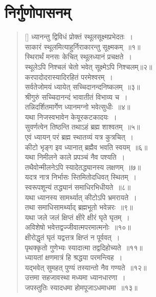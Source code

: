 \documentclass[twoside,12pt,notitlepage]{book}
\begin{document}
\section{निर्गुणोपासनम्}
\begin{verse}[\versewidth]
ध्यानन्तु द्विविधं प्रोक्तं स्थूलसूक्ष्मप्रभेदतः~।\\[-6pt]
साकारं स्थूलमित्याहुर्निराकारन्तु सूक्ष्मकम्~॥१॥\\
स्थिरार्थं मनसः केचित् स्थूलध्यानं प्रचक्षते~।\\[-6pt]
स्थूलेऽपि निश्चलं चेतो भवेत् सूक्ष्मेऽपि निश्चलम्॥२॥\\
करपादोदरास्यादिरहितं परमेश्वरम्~।\\[-6pt]
\clearpage
सर्वतेजोमयं ध्यायेत् सच्चिदानन्दनिष्कलम्~॥३॥\\
श्रीगुरुं सच्चिदानन्दं भावातीतं विभाव्य च~।\\[-6pt]
तन्निदर्शितमार्गेण ध्यानमग्नो भवेत्सुधीः~॥४॥\\
यथा निजस्वभावेन केयूरकटकादयः~।\\[-6pt]
सुवर्णत्वेन तिष्ठन्ति तथाऽहं ब्रह्म शाश्वतम्~॥५॥\\
एवं ध्यायन् परं ब्रह्म स्थातव्यं यत्र कुत्रचित्~।\\[-6pt]
कीटो भृङ्ग इव ध्यानात् ब्रह्मैव भवति स्वयम्~॥६॥\\
यथा निमीलने काले प्रपञ्चं नैव पश्यति~।\\[-6pt]
तथैवोन्मीलनेऽपि स्यादेतद्ध्यानस्य लक्षणम्~॥७॥\\
यदत्र नात्र निर्भासः स्तिमितोदधिवत् स्थितम्~।\\[-6pt]
स्वरूपशून्यं तद्ध्यानं समाधिरभिधीयते~॥८॥\\
यथा ध्यानस्य सामर्थ्यात् कीटोऽपि भ्रमरायते~।\\[-6pt]
तथा समाधिसामर्थ्याद् ब्रह्मभूतो भवेन्नरः~॥९॥\\
यथा जले जलं क्षिप्तं क्षीरे क्षीरं घृते घृतम्~।\\[-6pt]
अविशेषो  भवेत्तद्वज्जीवात्मपरमात्मनोः~॥१०॥\\
क्षीरोद्धृतं घृतं यद्वत्तत्र क्षिप्तं न पूर्ववत्~।\\[-6pt]
पृथक्कृतो गुणेभ्यः स्यादात्मा तद्वदिहोच्यते~॥११॥\\
ध्यायतां क्षणमात्रं हि श्रद्धया परमन्त्विह~।\\[-6pt]
यद्भवेत् सुमहत् पुण्यं तस्यान्तो नैव गण्यते~॥१२॥\\
उत्तमा सहजावस्था मध्यमा ध्यानधारणा~।\\[-6pt]
जपस्तुतिः स्यादधमा होमपूजाऽधमाधमा~॥१३॥\\

\end{verse}
\end{document}
